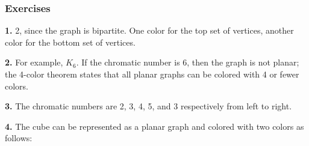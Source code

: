 \documentclass[10pt,]{book}
\theoremstyle{plain}
\theoremstyle{definition}
\theoremstyle{definition}
\theoremstyle{definition}
\numberwithin{equation}{chapter}
\newcommand{\vtx}[2]{node[fill,circle,inner sep=0pt, minimum size=4pt,label=#1:#2]{}}
\renewcommand{\v}{\vtx{above}{}}
\begin{document}
\subsubsection*{ Exercises}
\noindent\textbf{1.}\quad{}
2, since the graph is bipartite. One color for the top set of vertices, another color for the bottom set of vertices.
%
\par\smallskip
\noindent\textbf{2.}\quad{}
For example, \(K_6\). If the chromatic number is 6, then the graph is not planar; the 4-color theorem states that all planar graphs can be colored with 4 or fewer colors.
%
\par\smallskip
\noindent\textbf{3.}\quad{}
The chromatic numbers are 2, 3, 4, 5, and 3 respectively from left to right.
%
\par\smallskip
\noindent\textbf{4.}\quad{}
The cube can be represented as a planar graph and colored with two colors as follows:
%
\leavevmode%
\begin{figure}
\centering
{
}
\end{figure}
\par
\end{document}
